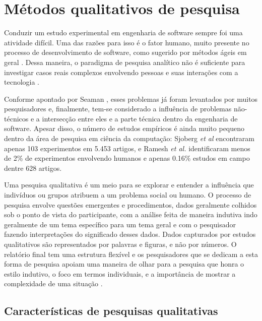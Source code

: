 \chapter{Métodos qualitativos de pesquisa} 
\label{cap:qualitativo}

Conduzir um estudo experimental em engenharia de software sempre foi uma
atividade difícil. Uma das razões para isso é o fator humano, muito presente 
no processo de desenvolvimento de software, como sugerido por métodos ágeis  em
geral \cite{AgileManifesto}. Dessa maneira, o paradigma de pesquisa analítico 
não é suficiente para investigar casos reais complexos envolvendo pessoas e 
suas interações com a tecnologia \cite{guidelines-case-study}.

Conforme apontado por Seaman \cite{seaman}, esses problemas já foram levantados
por muitos pesquisadores e, finalmente, tem-se considerado a influência de
problemas não-técnicos e a intersecção entre eles e a parte técnica
dentro da engenharia de software. 
Apesar disso, o número de estudos empíricos é ainda muito pequeno dentro da área
de pesquisa em ciência da computação: Sjoberg \textit{et al} \cite{sjoberg} encontraram
apenas 103 experimentos em 5.453 artigos, e Ramesh \textit{et al.} \cite{ramesh}
identificaram menos de 2\% de experimentos envolvendo humanos e apenas 0.16\% 
estudos em campo dentre 628 artigos.

Uma pesquisa qualitativa é um meio para se explorar e entender a influência que 
indivíduos ou grupos atribuem a um problema social ou humano. O processo de
pesquisa envolve questões emergentes e procedimentos, dados geralmente colhidos
sob o ponto de vista do participante, com a análise feita de maneira indutiva
indo geralmente de um tema específico para um tema geral e com o pesquisador
fazendo interpretações do significado desses dados. Dados capturados por estudos
qualitativos são representados por palavras e figuras, e não por números.
O relatório final tem uma estrutura flexível e os pesquisadores que se
dedicam a esta forma de pesquisa apoiam uma maneira de olhar para a pesquisa que
honra o estilo indutivo, o foco em termos individuais, e a importância de mostrar a 
complexidade de uma situação \cite{creswell}. 

\section{Características de pesquisas qualitativas}


